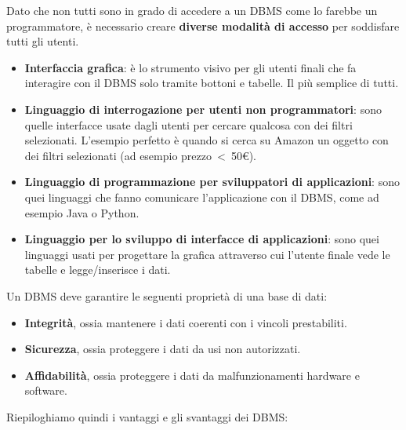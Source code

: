 \documentclass[11pt, a4paper, titlepage, oneside]{scrbook}
\begin{document}
\begin{Proprieta}
\label{prop-modalita-accesso-DBMS}
Dato che non tutti sono in grado di accedere a un DBMS come lo farebbe un programmatore, è necessario creare \textbf{diverse modalità di accesso} per soddisfare tutti gli utenti.
\begin{itemize}
    \item \textbf{Interfaccia grafica}: è lo strumento visivo per gli utenti finali che fa interagire con il DBMS solo tramite bottoni e tabelle. Il più semplice di tutti.
    \item \textbf{Linguaggio di interrogazione per utenti non programmatori}: sono quelle interfacce usate dagli utenti per cercare qualcosa con dei filtri selezionati. L'esempio perfetto è quando si cerca su Amazon un oggetto con dei filtri selezionati (ad esempio \mbox{prezzo < 50€}).
    \item \textbf{Linguaggio di programmazione per sviluppatori di applicazioni}: sono quei linguaggi che fanno comunicare l'applicazione con il DBMS, come ad esempio Java o Python.
    \item \textbf{Linguaggio per lo sviluppo di interfacce di applicazioni}: sono quei linguaggi usati per progettare la grafica attraverso cui l'utente finale vede le tabelle e legge/inserisce i dati.
\end{itemize}
\end{Proprieta}

\begin{Proprieta}
\label{prop-DB}
Un DBMS deve garantire le seguenti proprietà di una base di dati:
\begin{itemize}
    \item \textbf{Integrità}, ossia mantenere i dati coerenti con i vincoli prestabiliti.
    \item \textbf{Sicurezza}, ossia proteggere i dati da usi non autorizzati.
    \item \textbf{Affidabilità}, ossia proteggere i dati da malfunzionamenti hardware e software.
\end{itemize}
\end{Proprieta}

Riepiloghiamo quindi i vantaggi e gli svantaggi dei DBMS:
\end{document}
